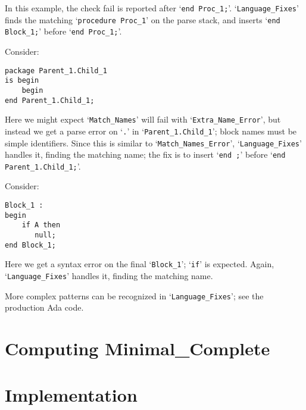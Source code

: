 \documentclass{article}
\newcommand{\code}[1]{`{\tt #1}'}
\begin{document}
In this example, the check fail is reported after \code{end Proc\_1;}.
\code{Language\_Fixes} finds the matching \code{procedure Proc\_1} on
the parse stack, and inserts \code{end Block\_1;} before
\code{end Proc\_1;}.

Consider:
\begin{verbatim}
package Parent_1.Child_1
is begin
    begin
end Parent_1.Child_1;
\end{verbatim}
Here we might expect \code{Match\_Names} will fail with
\code{Extra\_Name\_Error}, but instead we get a parse error on \code{.}
in \code{Parent\_1.Child\_1}; block names must be simple identifiers.
Since this is similar to \code{Match\_Names\_Error},
\code{Language\_Fixes} handles it, finding the matching name; the
fix is to insert \code{end ;} before \code{end Parent\_1.Child\_1;}.

Consider:
\begin{verbatim}
Block_1 :
begin
    if A then
       null;
end Block_1;
\end{verbatim}
\caption{}
Here we get a syntax error on the final \code{Block\_1}; \code{if} is
expected. Again, \code{Language\_Fixes} handles it, finding the
matching name.

More complex patterns can be recognized in \code{Language\_Fixes}; see
the production Ada code.

\section{Computing Minimal\_Complete}
\label{minimal-complete-compute}

\section{Implementation}
\end{document}
